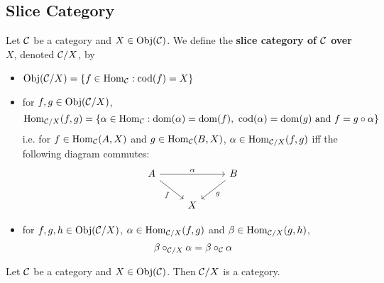\documentclass{book}
\begin{document}
	
	
	
	\subsection{Slice Category}
	
	\begin{defn} 
		Let $\mathcal{C}$ be a category and $X \in \operatorname{Obj}(\mathcal{C})$. We define the \textbf{slice category of $\mathcal{C}$ over $X$}, denoted $\mathcal{C} / X$, by
		\begin{itemize}
			\item $\operatorname{Obj}(\mathcal{C} / X) = \{f \in \operatorname{Hom}_{\mathcal{C}}: \operatorname{cod}(f) = X\}$
			\item for $f,g \in \operatorname{Obj}(\mathcal{C} / X)$, 
			$$\operatorname{Hom}_{\mathcal{C} / X}(f, g) = \{\alpha \in \operatorname{Hom}_{\mathcal{C}} : \operatorname{dom}(\alpha) = \operatorname{dom}(f) \text{, } \operatorname{cod}(\alpha) = \operatorname{dom}(g) \text{ and } f = g \circ \alpha \}$$
			i.e. for $f \in \operatorname{Hom}_{\mathcal{C}}(A, X)$ and $g \in \operatorname{Hom}_{\mathcal{C}}(B, X)$, $\alpha \in \operatorname{Hom}_{\mathcal{C} / X}(f, g)$ iff the following diagram commutes: 
			\[ 
			\begin{tikzcd}
				A \arrow[rr, "\al"] \arrow[dr, "f"'] 	
				& & B  \arrow[dl, "g"] \\
				& X 
			\end{tikzcd}
			\]
			\item for $f,g, h \in \operatorname{Obj}(\mathcal{C} / X)$, $\alpha \in \operatorname{Hom}_{\mathcal{C} / X}(f, g)$ and $\beta \in \operatorname{Hom}_{\mathcal{C} / X}(g, h)$, 
			$$\beta \circ_{\mathcal{C} / X} \alpha = \beta \circ_{\mathcal{C}} \alpha$$
		\end{itemize}
	\end{defn}
	
	\begin{ex}  
		Let $\mathcal{C}$ be a category and $X \in \operatorname{Obj}(\mathcal{C})$. Then $\mathcal{C} / X$ is a category.
	\end{ex}
\end{document}
